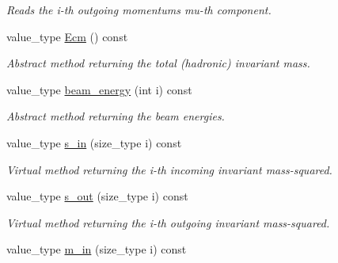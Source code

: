 \begin{DoxyCompactItemize}
\begin{DoxyCompactList}\small\item\em Reads the i-\/th outgoing momentum\textquotesingle{}s mu-\/th component. \end{DoxyCompactList}\item 
\hypertarget{a00544_af4ff8d535dd9b820e6937032b6f7ecff}{}value\+\_\+type \hyperlink{a00544_af4ff8d535dd9b820e6937032b6f7ecff}{Ecm} () const \label{a00544_af4ff8d535dd9b820e6937032b6f7ecff}

\begin{DoxyCompactList}\small\item\em Abstract method returning the total (hadronic) invariant mass. \end{DoxyCompactList}\item 
\hypertarget{a00544_a314adb09433282620cc5e2071f218c06}{}value\+\_\+type \hyperlink{a00544_a314adb09433282620cc5e2071f218c06}{beam\+\_\+energy} (int i) const \label{a00544_a314adb09433282620cc5e2071f218c06}

\begin{DoxyCompactList}\small\item\em Abstract method returning the beam energies. \end{DoxyCompactList}\item 
\hypertarget{a00544_a71d752a5acef264885ab6264fb98d18f}{}value\+\_\+type \hyperlink{a00544_a71d752a5acef264885ab6264fb98d18f}{s\+\_\+in} (size\+\_\+type i) const \label{a00544_a71d752a5acef264885ab6264fb98d18f}

\begin{DoxyCompactList}\small\item\em Virtual method returning the i-\/th incoming invariant mass-\/squared. \end{DoxyCompactList}\item 
\hypertarget{a00544_af3cd0ccd868f83080ba0569511acff5b}{}value\+\_\+type \hyperlink{a00544_af3cd0ccd868f83080ba0569511acff5b}{s\+\_\+out} (size\+\_\+type i) const \label{a00544_af3cd0ccd868f83080ba0569511acff5b}

\begin{DoxyCompactList}\small\item\em Virtual method returning the i-\/th outgoing invariant mass-\/squared. \end{DoxyCompactList}\item 
\hypertarget{a00544_a6dab2ba04d5b791e5cf22c988f046ade}{}value\+\_\+type \hyperlink{a00544_a6dab2ba04d5b791e5cf22c988f046ade}{m\+\_\+in} (size\+\_\+type i) const \label{a00544_a6dab2ba04d5b791e5cf22c988f046ade}


\end{DoxyCompactItemize}
